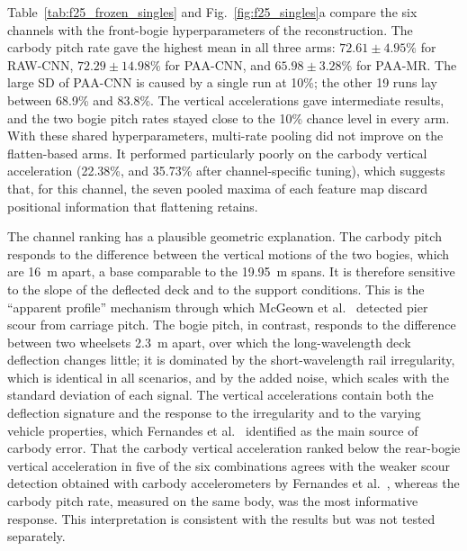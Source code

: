 Table~\ref{tab:f25_frozen_singles} and Fig.~\ref{fig:f25_singles}a compare the
six channels with the front-bogie hyperparameters of the reconstruction. The
carbody pitch rate gave the highest mean in all three arms: $72.61\pm4.95\%$
for RAW-CNN, $72.29\pm14.98\%$ for PAA-CNN, and $65.98\pm3.28\%$ for PAA-MR. The
large SD of PAA-CNN is caused by a single run at 10\%; the other 19 runs lay
between 68.9\% and 83.8\%. The vertical accelerations gave intermediate
results, and the two bogie pitch rates stayed close to the 10\% chance level in
every arm. With these shared hyperparameters, multi-rate pooling did not
improve on the flatten-based arms. It performed particularly poorly on the
carbody vertical acceleration (22.38\%, and 35.73\% after channel-specific
tuning), which suggests that, for this channel, the seven pooled maxima of each
feature map discard positional information that flattening retains.

\begin{table}[htbp]
\centering
\caption{Ten-class test accuracy with shared hyperparameters (mean $\pm$ sample
SD over 20 runs, \%). All arms use the front-bogie hyperparameters of the
reconstruction; PAA-MR uses the PAA-CNN vector with multi-rate pooling.}
\label{tab:f25_frozen_singles}
\footnotesize
\setlength{\tabcolsep}{4pt}
\resizebox{\textwidth}{!}{}
\end{table}

The channel ranking has a plausible geometric explanation. The carbody pitch
responds to the difference between the vertical motions of the two bogies,
which are 16~m apart, a base comparable to the 19.95~m spans. It is therefore
sensitive to the slope of the deflected deck and to the support conditions.
This is the ``apparent profile'' mechanism through which McGeown et
al.~\cite{mcgeown2024pitch} detected pier scour from carriage pitch. The bogie
pitch, in contrast, responds to the difference between two wheelsets 2.3~m
apart, over which the long-wavelength deck deflection changes little; it is
dominated by the short-wavelength rail irregularity, which is identical in all
scenarios, and by the added noise, which scales with the standard deviation of
each signal. The vertical accelerations contain both the deflection signature
and the response to the irregularity and to the varying vehicle properties,
which Fernandes et al.~\cite{fernandes2025early} identified as the main source
of carbody error. That the carbody vertical acceleration ranked below the
rear-bogie vertical acceleration in five of the six combinations agrees with
the weaker scour detection obtained with carbody accelerometers by Fernandes et
al.~\cite{fernandes2024driveby}, whereas the carbody pitch rate, measured on the
same body, was the most informative response.
This interpretation is consistent with the results but was not tested
separately.

